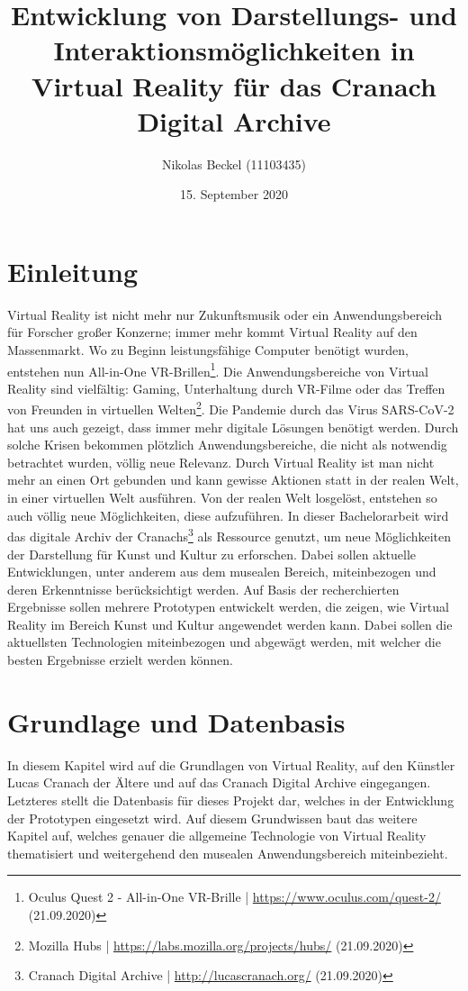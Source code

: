 \documentclass[a4paper,12pt,oneside]{article}
\title{Entwicklung von Darstellungs- und Interaktionsmöglichkeiten in Virtual Reality für das Cranach Digital Archive}
\author{Nikolas Beckel (11103435)}
\date{15. September 2020}
\begin{document}
  \tableofcontents
  \newpage
  \section{Einleitung}
      
    Virtual Reality ist nicht mehr nur Zukunftsmusik oder ein Anwendungsbereich für Forscher
    großer Konzerne; immer mehr kommt Virtual Reality auf den Massenmarkt. Wo zu Beginn
    leistungsfähige Computer benötigt wurden, entstehen nun All-in-One VR-Brillen\footnote{Oculus Quest 2 - All-in-One VR-Brille | \url{https://www.oculus.com/quest-2/} (21.09.2020)}.
    Die Anwendungsbereiche von Virtual Reality sind vielfältig: Gaming, Unterhaltung durch VR-Filme oder
    das Treffen von Freunden in virtuellen Welten\footnote{Mozilla Hubs | \url{https://labs.mozilla.org/projects/hubs/} (21.09.2020)}.
    Die Pandemie durch das Virus SARS-CoV-2 hat uns auch gezeigt, dass immer mehr digitale Lösungen
    benötigt werden. Durch solche Krisen bekommen plötzlich Anwendungsbereiche, die nicht als
    notwendig betrachtet wurden, völlig neue Relevanz.
    Durch Virtual Reality ist man nicht mehr an einen Ort gebunden und kann gewisse Aktionen
    statt in der realen Welt, in einer virtuellen Welt ausführen. Von der realen Welt
    losgelöst, entstehen so auch völlig neue Möglichkeiten, diese aufzuführen.
    In dieser Bachelorarbeit wird das digitale Archiv der Cranachs\footnote{Cranach Digital Archive | \url{http://lucascranach.org/} (21.09.2020)}
    als Ressource genutzt, um neue Möglichkeiten der Darstellung für Kunst und Kultur zu erforschen.
    Dabei sollen aktuelle Entwicklungen, unter anderem aus dem musealen Bereich, miteinbezogen 
    und deren Erkenntnisse berücksichtigt werden.
    Auf Basis der recherchierten Ergebnisse sollen mehrere Prototypen entwickelt werden,
    die zeigen, wie Virtual Reality im Bereich Kunst und Kultur angewendet werden kann. 
    Dabei sollen die
    aktuellsten Technologien miteinbezogen und abgewägt werden, mit welcher die
    besten Ergebnisse erzielt werden können.

  \section{Grundlage und Datenbasis}
    In diesem Kapitel wird auf die Grundlagen von Virtual Reality, auf den Künstler Lucas Cranach 
    der Ältere und auf das Cranach Digital Archive eingegangen. Letzteres stellt 
    die Datenbasis für dieses Projekt dar, welches in der Entwicklung der Prototypen 
    eingesetzt wird. 
    Auf diesem Grundwissen baut das weitere Kapitel auf, welches genauer 
    die allgemeine Technologie von Virtual Reality thematisiert und weitergehend
    den musealen Anwendungsbereich miteinbezieht.
\end{document}
